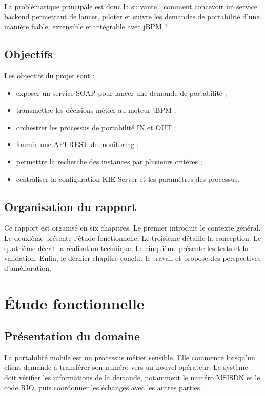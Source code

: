 \documentclass[12pt,a4paper]{report}
\begin{document}
La problématique principale est donc la suivante : comment concevoir un service backend permettant de lancer, piloter et suivre les demandes de portabilité d'une manière fiable, extensible et intégrable avec jBPM ?

\section{Objectifs}
Les objectifs du projet sont :
\begin{itemize}
    \item exposer un service SOAP pour lancer une demande de portabilité ;
    \item transmettre les décisions métier au moteur jBPM ;
    \item orchestrer les processus de portabilité IN et OUT ;
    \item fournir une API REST de monitoring ;
    \item permettre la recherche des instances par plusieurs critères ;
    \item centraliser la configuration KIE Server et les paramètres des processus.
\end{itemize}

\section{Organisation du rapport}
Ce rapport est organisé en six chapitres. Le premier introduit le contexte général. Le deuxième présente l'étude fonctionnelle. Le troisième détaille la conception. Le quatrième décrit la réalisation technique. Le cinquième présente les tests et la validation. Enfin, le dernier chapitre conclut le travail et propose des perspectives d'amélioration.

\chapter{Étude fonctionnelle}
\section{Présentation du domaine}
La portabilité mobile est un processus métier sensible. Elle commence lorsqu'un client demande à transférer son numéro vers un nouvel opérateur. Le système doit vérifier les informations de la demande, notamment le numéro MSISDN et le code RIO, puis coordonner les échanges avec les autres parties.
\end{document}
